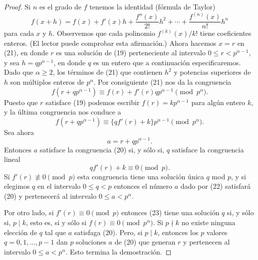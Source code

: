 \documentclass[12pt,a4paper]{book}
\begin{document}
    \begin{proof}
        Si $n$ es el grado de $f$ tenemos la identidad (fórmula de Taylor)
        \begin{equation}
            f(x+h)=f(x)+f'(x)h+\frac{f''(x)}{2!}h^{2}+\cdots+\frac{f^{(n)}(x)}{n!}h^{n}
        \end{equation}
        para cada $x$ y $h$. Observemos que cada polinomio $f^{(k)}(x)/k!$ tiene
        coeficientes enteros. (El lector puede comprobar esta afirmación.) Ahora hacemos
        $x=r$ en (21), en donde $r$ es una solución de (19) perteneciente al intervalo
        $0\leq r<p^{\alpha-1}$, y sea $h=qp^{\alpha-1}$, en donde $q$ es un entero que a
        continuación especificaremos. Dado que $\alpha\geq2$, los términos de (21) que
        contienen $h^{2}$ y potencias superiores de $h$ son múltiplos enteros de
        $p^{\alpha}$. Por consiguiente (21) nos da la congruencia
        \begin{equation*}
            f(r+qp^{\alpha-1})\equiv f(r)+f'(r)qp^{\alpha-1}\pmod{p^{\alpha}}.
        \end{equation*}
        Puesto que $r$ satisface (19) podemos escribir $f(r)=kp^{\alpha-1}$ para algún
        entero $k$, y la última congruencia nos conduce a
        \begin{equation*}
            f(r+qp^{\alpha-1})\equiv\{qf'(r)+k\}p^{\alpha-1}\pmod{p^{\alpha}}.
        \end{equation*}
        Sea ahora
        \begin{equation}
            a=r+qp^{\alpha-1}.
        \end{equation}
        Entonces $a$ satisface la congruencia (20) si, y sólo si, $q$ satisface la
        congruencia lineal
        \begin{equation}
            qf'(r)+k\equiv0\pmod{p}.
        \end{equation}
        Si $f'(r)\not\equiv0\pmod{p}$ esta congruencia tiene una solución única $q$ mod
        $p$, y si elegimos $q$ en el intervalo $0\leq q<p$ entonces el número $a$ dado por
        (22) satisfará (20) y pertenecerá al intervalo $0\leq a<p^{\alpha}$.

        Por otro lado, si $f'(r)\equiv0\pmod{p}$ entonces (23) tiene una solución $q$ si,
        y sólo si, $p\mid k$, esto es, si y sólo si $f(r)\equiv0\pmod{p^{\alpha}}$. Si
        $p\nmid k$ no existe ninguna elección de $q$ tal que $a$ satisfaga (20). Pero, si
        $p\mid k$, entonces los $p$ valores $q=0,1,\dots,p-1$ dan $p$ soluciones $a$ de
        (20) que generan $r$ y pertenecen al intervalo $0\leq a<p^{\alpha}$. Esto termina
        la demostración.
    \end{proof}
\end{document}
